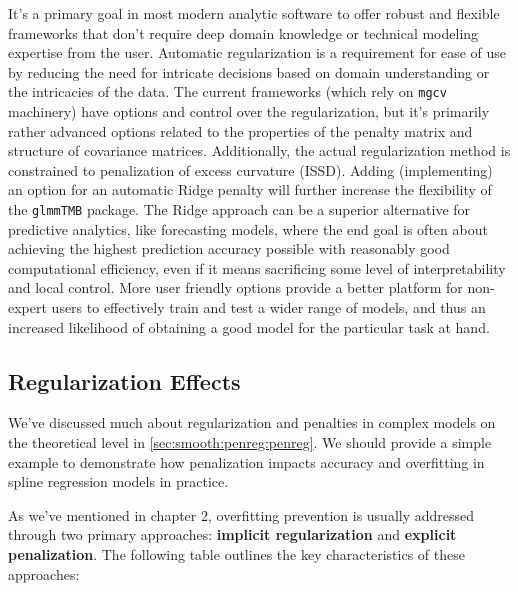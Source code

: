 \documentclass[12pt, twoside,hidelinks]{article}
\theoremstyle{definition}
\numberwithin{equation}{section}
\begin{document}
It's a primary goal in most modern analytic software to offer robust and flexible frameworks that don't require deep domain knowledge or technical modeling expertise from the user. Automatic regularization is a requirement for ease of use by reducing the need for intricate decisions based on domain understanding or the intricacies of the data. The current frameworks (which rely on \texttt{mgcv} machinery) have options and control over the regularization, but it's primarily rather advanced options related to the properties of the penalty matrix and structure of covariance matrices. Additionally, the actual regularization method is constrained to penalization of excess curvature (ISSD). Adding (implementing) an option for an automatic Ridge penalty will further increase the flexibility of the \texttt{glmmTMB} package. The Ridge approach can be a superior alternative for predictive analytics, like forecasting models, where the end goal is often about achieving the highest prediction accuracy possible with reasonably good computational efficiency, even if it means sacrificing some level of interpretability and local control. More user friendly options provide a better platform for non-expert users to effectively train and test a wider range of models, and thus an increased likelihood of obtaining a good model for the particular task at hand. 
\newline

\subsection{Regularization Effects}\label{sec:penunpencompare}

We've discussed much about regularization and penalties in complex models on the theoretical level in \ref{sec:smooth:penreg:penreg}. We should provide a simple example to demonstrate how penalization impacts accuracy and overfitting in spline regression models in practice. 

As we've mentioned in chapter 2, overfitting prevention is usually addressed through two primary approaches: \textbf{implicit regularization} and \textbf{explicit penalization}. The following table outlines the key characteristics of these approaches:
\end{document}
